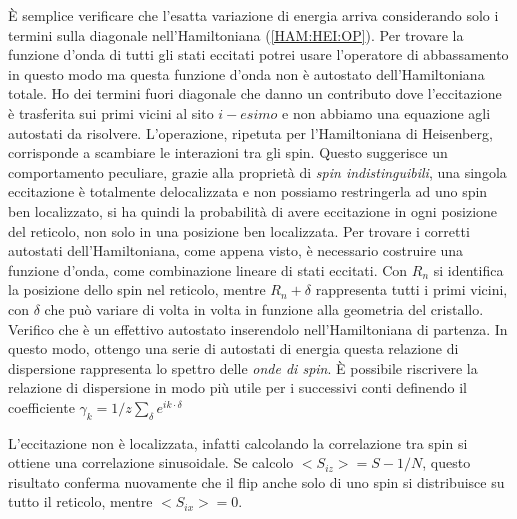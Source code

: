 \`E semplice verificare che l'esatta variazione di energia arriva considerando solo i termini sulla diagonale nell'Hamiltoniana (\ref{HAM:HEI:OP}). 
Per trovare la funzione d'onda di tutti gli stati eccitati potrei usare l'operatore di abbassamento in questo modo
ma questa funzione d'onda non \`e autostato dell'Hamiltoniana totale. Ho dei termini fuori diagonale che  danno un contributo
dove l'eccitazione \`e trasferita sui primi vicini al sito $i-esimo$ e non abbiamo una equazione agli autostati da risolvere. L'operazione, ripetuta per l'Hamiltoniana di Heisenberg, corrisponde a scambiare le interazioni tra gli spin. Questo suggerisce un comportamento peculiare, grazie alla propriet\`a di \textit{spin indistinguibili}, una singola eccitazione \`e totalmente delocalizzata e non possiamo restringerla ad uno spin ben localizzato, si ha quindi la probabilit\`a di avere eccitazione in ogni posizione del reticolo, non solo in una posizione ben localizzata.
Per trovare i corretti autostati dell'Hamiltoniana, come appena visto, \`e necessario costruire una funzione d'onda, come combinazione lineare di stati eccitati. Con $R_n$ si identifica la posizione dello spin nel reticolo, mentre $R_n+\delta$ rappresenta tutti i primi vicini, con $\delta$ che pu\`o variare di volta in volta in funzione alla geometria del cristallo.
Verifico che \`e un effettivo autostato inserendolo nell'Hamiltoniana di partenza. In questo modo, ottengo una serie di autostati di energia
questa relazione di dispersione rappresenta lo spettro delle \textit{onde di spin}. \`E possibile riscrivere la relazione di dispersione in modo pi\`u utile per i successivi conti definendo il coefficiente $\gamma_k = 1/z \sum_\delta e^{ik\cdot\delta}$

L'eccitazione non \`e localizzata, infatti calcolando la correlazione tra spin si ottiene
una correlazione sinusoidale. Se calcolo  $<S_{iz}> = S - 1/N$, questo risultato conferma nuovamente che il flip anche solo di uno spin si distribuisce su tutto il reticolo, mentre $<S_{ix}> =0$.

